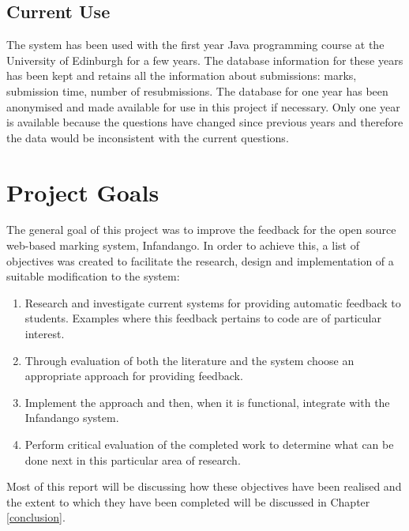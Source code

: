 \subsection{Current Use}
The system has been used with the first year Java programming course at the University of Edinburgh for a few years. The database information for these years has been kept and retains all the information about submissions: marks, submission time, number of resubmissions. The database for one year has been anonymised and made available for use in this project if necessary. Only one year is available because the questions have changed since previous years and therefore the data would be inconsistent with the current questions.

\section{Project Goals}
The general goal of this project was to improve the feedback for the open source web-based marking system, Infandango\cite{infandango_note}. In order to achieve this, a list of objectives was created to facilitate the research, design and implementation of a suitable modification to the system:

\begin{enumerate}
\item Research and investigate current systems for providing automatic feedback to students. Examples where this feedback pertains to code are of particular interest.
\item Through evaluation of both the literature and the system choose an appropriate approach for providing feedback.
\item Implement the approach and then, when it is functional, integrate with the Infandango system.
\item Perform critical evaluation of the completed work to determine what can be done next in this particular area of research.
\end{enumerate}

Most of this report will be discussing how these objectives have been realised and the extent to which they have been completed will be discussed in Chapter \ref{conclusion}.
